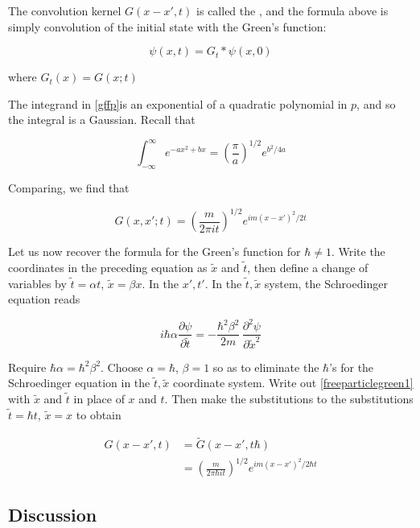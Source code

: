 The convolution kernel $G(x-x',t)$ is called the , and the formula above is simply convolution of the initial state with the Green's function:

\begin{equation}
\psi(x,t) = G_t*\psi(x,0)
\end{equation}

where $G_t(x) = G(x;t)$

The integrand in \eqref{gffp}is an exponential of a quadratic polynomial in $p$, and so the integral is a Gaussian.  Recall that

\begin{equation}
\int_{-\infty}^\infty e^{ -ax^2 + bx}  = \left(\frac{\pi}{a}\right)^{1/2} e^{ b^2/4a}
\end{equation}

Comparing, we find that

\begin{equation}
\label{freeparticlegreen1} G(x,x';t) = \left(\frac{m}{2\pi i t}\right)^{1/2} e^{ im(x-x')^2/2t}
\end{equation}


Let us now recover the formula for the Green's function for $\hbar \ne 1$.  Write the coordinates in the preceding equation as    $\tilde x$ and $\tilde t$, then define a change of variables by $\tilde t = \alpha t$, $\tilde x = \beta x$.  In the $x',t'$.  In the $\tilde t, \tilde x$ system, the Schroedinger equation reads

\begin{equation}
i\hbar\alpha\frac{\partial \psi}{\partial \tilde t} = -\frac{\hbar^2 \beta^2}{2m}\, \frac{\partial^2 \psi}{\partial \tilde x^2}
\end{equation}

Require $\hbar \alpha = \hbar^2\beta^2$.
Choose $\alpha = \hbar$, $\beta = 1$ so as to eliminate the $\hbar$'s for the Schroedinger equation in the $\tilde t, \tilde x$ coordinate system.  Write out \eqref{freeparticlegreen1} with $\tilde x$ and $\tilde t$ in place of $x$ and $t$.  Then make the substitutions to the substitutions $\tilde t = \hbar t$, $\tilde x = x$ to obtain

\begin{align}
G(x-x',t) &= \widetilde G\left(x-x', t\hbar \right) \\
&= \left( \frac{m}{2\pi \hbar i t} \right)^{1/2} e^{ im(x-x')^2/2\hbar t} 
\end{align}

\subsection{Discussion}

